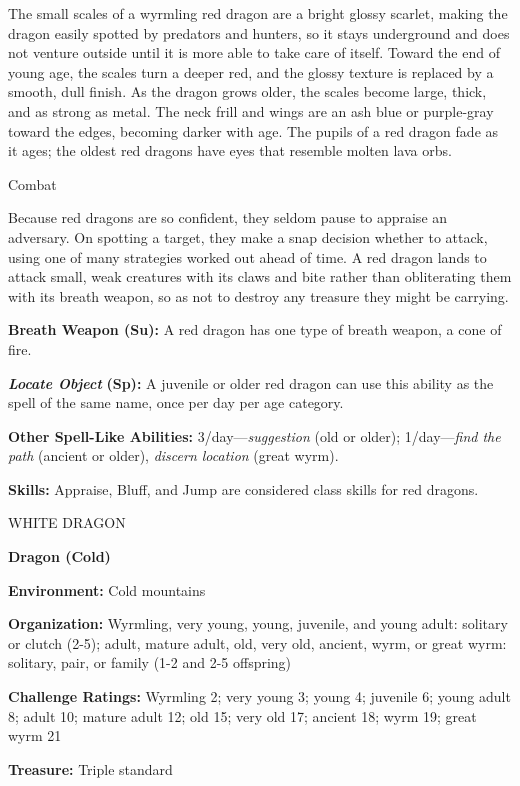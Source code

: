\documentclass{article}
\begin{document}
The small scales of a wyrmling red dragon are a bright glossy scarlet, making the 
dragon easily spotted by predators and hunters, so it stays underground and does 
not venture outside until it is more able to take care of itself. Toward the end 
of young age, the scales turn a deeper red, and the glossy texture is replaced 
by a smooth, dull finish. As the dragon grows older, the scales become large, thick, 
and as strong as metal. The neck frill and wings are an ash blue or purple-gray 
toward the edges, becoming darker with age. The pupils of a red dragon fade as 
it ages; the oldest red dragons have eyes that resemble molten lava orbs.

Combat

Because red dragons are so confident, they seldom pause to appraise an adversary. 
On spotting a target, they make a snap decision whether to attack, using one of 
many strategies worked out ahead of time. A red dragon lands to attack small, weak 
creatures with its claws and bite rather than obliterating them with its breath 
weapon, so as not to destroy any treasure they might be carrying.

\textbf{Breath Weapon (Su):} A red dragon has one type of breath weapon, a cone 
of fire.

\textit{\textbf{Locate Object }}\textbf{(Sp): }A juvenile or older red dragon can 
use this ability as the spell of the same name, once per day per age category.

\textbf{Other Spell-Like Abilities:} 3/day---\textit{suggestion }(old or older); 
1/day---\textit{find the path }(ancient or older), \textit{discern location }(great 
wyrm).

\textbf{Skills:} Appraise, Bluff, and Jump are considered class skills for red 
dragons.

\vspace{12pt}
WHITE DRAGON

\textbf{Dragon (Cold)}

\textbf{Environment:} Cold mountains

\textbf{Organization:} Wyrmling, very young, young, juvenile, and young adult: 
solitary or clutch (2-5); adult, mature adult, old, very old, ancient, wyrm, or 
great wyrm: solitary, pair, or family (1-2 and 2-5 offspring)

\textbf{Challenge Ratings:} Wyrmling 2; very young 3; young 4; juvenile 6; young 
adult 8; adult 10; mature adult 12; old 15; very old 17; ancient 18; wyrm 19; great 
wyrm 21

\textbf{Treasure: }Triple standard
\end{document}
